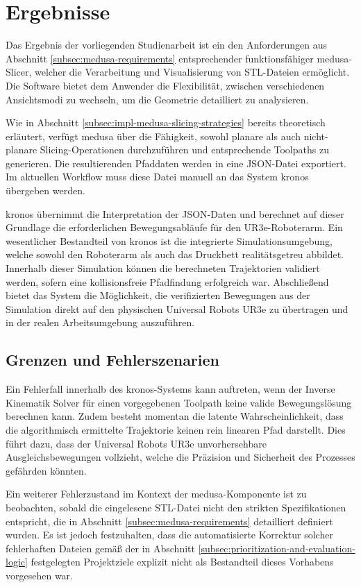   \section{Ergebnisse} \label{sec:results}
    Das Ergebnis der vorliegenden Studienarbeit ist ein den Anforderungen aus Abschnitt \ref{subsec:medusa-requirements} entsprechender funktionsfähiger \ac{medusa}-Slicer, welcher die Verarbeitung und Visualisierung von \ac{STL}-Dateien ermöglicht.
    Die Software bietet dem Anwender die Flexibilität, zwischen verschiedenen Ansichtsmodi zu wechseln, um die Geometrie detailliert zu analysieren.

    Wie in Abschnitt \ref{subsec:impl-medusa-slicing-strategies} bereits theoretisch erläutert, verfügt \ac{medusa} über die Fähigkeit, sowohl planare als auch nicht-planare Slicing-Operationen durchzuführen und entsprechende Toolpaths zu generieren.
    Die resultierenden Pfaddaten werden in eine \ac{JSON}-Datei exportiert.
    Im aktuellen Workflow muss diese Datei manuell an das System \ac{kronos} übergeben werden.

    \ac{kronos} übernimmt die Interpretation der \ac{JSON}-Daten und berechnet auf dieser Grundlage die erforderlichen Bewegungsabläufe für den UR3e-Roboterarm.
    Ein wesentlicher Bestandteil von \ac{kronos} ist die integrierte Simulationsumgebung, welche sowohl den Roboterarm als auch das Druckbett realitätsgetreu abbildet.
    Innerhalb dieser Simulation können die berechneten Trajektorien validiert werden, sofern eine kollisionsfreie Pfadfindung erfolgreich war.
    Abschließend bietet das System die Möglichkeit, die verifizierten Bewegungen aus der Simulation direkt auf den physischen Universal Robots UR3e zu übertragen und in der realen Arbeitsumgebung auszuführen.

    \subsection{Grenzen und Fehlerszenarien} \label{subsec:limitations-and-failure-scenarios}
      Ein Fehlerfall innerhalb des \ac{kronos}-Systems kann auftreten,
      wenn der Inverse Kinematik Solver für einen vorgegebenen Toolpath keine valide Bewegungslösung berechnen kann.
      Zudem besteht momentan die latente Wahrscheinlichkeit,
      dass die algorithmisch ermittelte Trajektorie keinen rein linearen Pfad darstellt.
      Dies führt dazu, dass der Universal Robots UR3e unvorhersehbare Ausgleichsbewegungen vollzieht,
      welche die Präzision und Sicherheit des Prozesses gefährden könnten.

      Ein weiterer Fehlerzustand im Kontext der \ac{medusa}-Komponente ist zu beobachten,
      sobald die eingelesene \ac{STL}-Datei nicht den strikten Spezifikationen entspricht,
      die in Abschnitt \ref{subsec:medusa-requirements} detailliert definiert wurden.
      Es ist jedoch festzuhalten, dass die automatisierte Korrektur solcher fehlerhaften Dateien
      gemäß der in Abschnitt \ref{subsec:prioritization-and-evaluation-logic} festgelegten Projektziele
      explizit nicht als Bestandteil dieses Vorhabens vorgesehen war.

